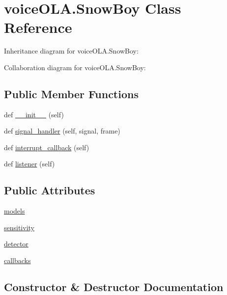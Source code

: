 \hypertarget{classvoiceOLA_1_1SnowBoy}{}\section{voice\+O\+L\+A.\+Snow\+Boy Class Reference}
\label{classvoiceOLA_1_1SnowBoy}


Inheritance diagram for voice\+O\+L\+A.\+Snow\+Boy\+:


Collaboration diagram for voice\+O\+L\+A.\+Snow\+Boy\+:
\subsection*{Public Member Functions}
\begin{DoxyCompactItemize}
\item 
def \hyperlink{classvoiceOLA_1_1SnowBoy_a8e78736d7f6c4bf9bc79aa857c9e1f36}{\+\_\+\+\_\+init\+\_\+\+\_\+} (self)
\item 
def \hyperlink{classvoiceOLA_1_1SnowBoy_a2770703754e331b443acbcc3fe97a5ca}{signal\+\_\+handler} (self, signal, frame)
\item 
def \hyperlink{classvoiceOLA_1_1SnowBoy_a14734dcdb17fbfd5709d3abf47c77e0e}{interrupt\+\_\+callback} (self)
\item 
def \hyperlink{classvoiceOLA_1_1SnowBoy_a0b7f93d9599b0862b67f1ecb3dc56b6e}{listener} (self)
\end{DoxyCompactItemize}
\subsection*{Public Attributes}
\begin{DoxyCompactItemize}
\item 
\hyperlink{classvoiceOLA_1_1SnowBoy_aaa4dad2978716142ba8097884afcc517}{models}
\item 
\hyperlink{classvoiceOLA_1_1SnowBoy_af19c996792bb8af65dc007390d59c459}{sensitivity}
\item 
\hyperlink{classvoiceOLA_1_1SnowBoy_a5be49a0ae11c7b41494cf42ecf26e88b}{detector}
\item 
\hyperlink{classvoiceOLA_1_1SnowBoy_a0fc25862a15ea5722de0a5aea15143cb}{callbacks}
\end{DoxyCompactItemize}


\subsection{Constructor \& Destructor Documentation}
\mbox{\label{classvoiceOLA_1_1SnowBoy_a8e78736d7f6c4bf9bc79aa857c9e1f36}} 

